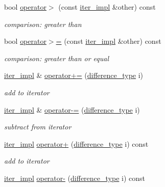 \begin{DoxyCompactItemize}
bool \mbox{\hyperlink{classnlohmann_1_1detail_1_1iter__impl_aaf3620b8dfa4bed8a9ac2b51dd55dbd7}{operator$>$}} (const \mbox{\hyperlink{classnlohmann_1_1detail_1_1iter__impl}{iter\+\_\+impl}} \&other) const
\begin{DoxyCompactList}\small\item\em comparison\+: greater than \end{DoxyCompactList}\item 
bool \mbox{\hyperlink{classnlohmann_1_1detail_1_1iter__impl_a634f85da575cb60b012a687efa26e11a}{operator$>$=}} (const \mbox{\hyperlink{classnlohmann_1_1detail_1_1iter__impl}{iter\+\_\+impl}} \&other) const
\begin{DoxyCompactList}\small\item\em comparison\+: greater than or equal \end{DoxyCompactList}\item 
\mbox{\hyperlink{classnlohmann_1_1detail_1_1iter__impl}{iter\+\_\+impl}} \& \mbox{\hyperlink{classnlohmann_1_1detail_1_1iter__impl_a3eef94f9d167046e7f773aeb6b78090c}{operator+=}} (\mbox{\hyperlink{classnlohmann_1_1detail_1_1iter__impl_a2f7ea9f7022850809c60fc3263775840}{difference\+\_\+type}} i)
\begin{DoxyCompactList}\small\item\em add to iterator \end{DoxyCompactList}\item 
\mbox{\hyperlink{classnlohmann_1_1detail_1_1iter__impl}{iter\+\_\+impl}} \& \mbox{\hyperlink{classnlohmann_1_1detail_1_1iter__impl_abcc9d51bc52f2e8483bbe4018f05e978}{operator-\/=}} (\mbox{\hyperlink{classnlohmann_1_1detail_1_1iter__impl_a2f7ea9f7022850809c60fc3263775840}{difference\+\_\+type}} i)
\begin{DoxyCompactList}\small\item\em subtract from iterator \end{DoxyCompactList}\item 
\mbox{\hyperlink{classnlohmann_1_1detail_1_1iter__impl}{iter\+\_\+impl}} \mbox{\hyperlink{classnlohmann_1_1detail_1_1iter__impl_a8ef76aeb5a5032768f0f61f48ac189c0}{operator+}} (\mbox{\hyperlink{classnlohmann_1_1detail_1_1iter__impl_a2f7ea9f7022850809c60fc3263775840}{difference\+\_\+type}} i) const
\begin{DoxyCompactList}\small\item\em add to iterator \end{DoxyCompactList}\item 
\mbox{\hyperlink{classnlohmann_1_1detail_1_1iter__impl}{iter\+\_\+impl}} \mbox{\hyperlink{classnlohmann_1_1detail_1_1iter__impl_a0dd9c415b94a02ff2aa25da75e52da30}{operator-\/}} (\mbox{\hyperlink{classnlohmann_1_1detail_1_1iter__impl_a2f7ea9f7022850809c60fc3263775840}{difference\+\_\+type}} i) const

\end{DoxyCompactItemize}

